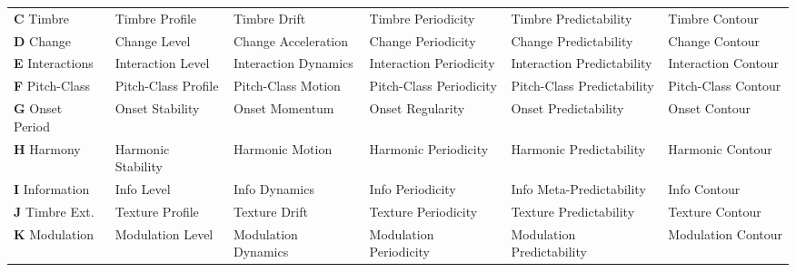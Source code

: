 {\begin{longtable}{@{}
  >{\raggedright}p{1.8cm}
  >{\raggedright}p{2.5cm}
  >{\raggedright}p{2.5cm}
  >{\raggedright}p{2.3cm}
  >{\raggedright}p{2.0cm}
  >{\raggedright\arraybackslash}p{2.3cm}
@{}}
\rowcolor{grpC}
\textbf{C} Timbre \newline {\scriptsize [12:20]}
  & Timbre Profile
  & Timbre Drift
  & Timbre Periodicity
  & Timbre Predictability
  & Timbre Contour \\[2pt]

\rowcolor{grpD}
\textbf{D} Change \newline {\scriptsize [21:24]}
  & Change Level
  & Change Acceleration
  & Change Periodicity
  & Change Predictability
  & Change Contour \\[2pt]

\rowcolor{grpE}
\textbf{E} Interactions \newline {\scriptsize [25:48]}
  & Interaction Level
  & Interaction Dynamics
  & Interaction Periodicity
  & Interaction Predictability
  & Interaction Contour \\[2pt]

\rowcolor{grpF}
\textbf{F} Pitch-Class \newline {\scriptsize [49:64]}
  & Pitch-Class Profile
  & Pitch-Class Motion
  & Pitch-Class Periodicity
  & Pitch-Class Predictability
  & Pitch-Class Contour \\[2pt]

\rowcolor{grpG}
\textbf{G} Onset Period \newline {\scriptsize [65:74]}
  & Onset Stability
  & Onset Momentum
  & Onset Regularity
  & Onset Predictability
  & Onset Contour \\[2pt]

\rowcolor{grpH}
\textbf{H} Harmony \newline {\scriptsize [75:86]}
  & Harmonic Stability
  & Harmonic Motion
  & Harmonic Periodicity
  & Harmonic Predictability
  & Harmonic Contour \\[2pt]

\rowcolor{grpI}
\textbf{I} Information \newline {\scriptsize [87:93]}
  & Info Level
  & Info Dynamics
  & Info Periodicity
  & Info Meta-Predictability
  & Info Contour \\[2pt]

\rowcolor{grpJ}
\textbf{J} Timbre Ext. \newline {\scriptsize [94:113]}
  & Texture Profile
  & Texture Drift
  & Texture Periodicity
  & Texture Predictability
  & Texture Contour \\[2pt]

\rowcolor{grpK}
\textbf{K} Modulation \newline {\scriptsize [114:127]}
  & Modulation Level
  & Modulation Dynamics
  & Modulation Periodicity
  & Modulation Predictability
  & Modulation Contour \\

\end{longtable}
}%

